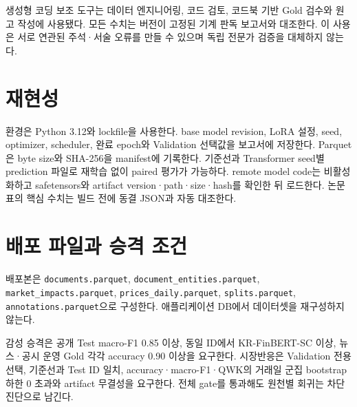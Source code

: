 \documentclass[10pt,a4paper,twocolumn]{article}
\begin{document}
생성형 코딩 보조 도구는 데이터 엔지니어링, 코드 검토, 코드북 기반 Gold 검수와 원고 작성에 사용됐다. 모든 수치는 버전이 고정된 기계 판독 보고서와 대조한다. 이 사용은 서로 연관된 주석·서술 오류를 만들 수 있으며 독립 전문가 검증을 대체하지 않는다.

\section*{재현성}

환경은 Python 3.12와 lockfile을 사용한다. base model revision, LoRA 설정, seed, optimizer, scheduler, 완료 epoch와 Validation 선택값을 보고서에 저장한다. Parquet은 byte size와 SHA-256을 manifest에 기록한다. 기준선과 Transformer seed별 prediction 파일로 재학습 없이 paired 평가가 가능하다. remote model code는 비활성화하고 safetensors와 artifact version·path·size·hash를 확인한 뒤 로드한다. 논문 표의 핵심 수치는 빌드 전에 동결 JSON과 자동 대조한다.

\appendix
\section{배포 파일과 승격 조건}

배포본은 \texttt{documents.parquet}, \texttt{document\_entities.parquet}, \texttt{market\_impacts.parquet}, \texttt{prices\_daily.parquet}, \texttt{splits.parquet}, \texttt{annotations.parquet}으로 구성한다. 애플리케이션 DB에서 데이터셋을 재구성하지 않는다.

감성 승격은 공개 Test macro-F1 0.85 이상, 동일 ID에서 KR-FinBERT-SC 이상, 뉴스·공시 운영 Gold 각각 accuracy 0.90 이상을 요구한다. 시장반응은 Validation 전용 선택, 기준선과 Test ID 일치, accuracy·macro-F1·QWK의 거래일 군집 bootstrap 하한 0 초과와 artifact 무결성을 요구한다. 전체 gate를 통과해도 원천별 회귀는 차단 진단으로 남긴다.

\begingroup
\renewcommand{\emph}[1]{#1}


\endgroup
\end{document}
